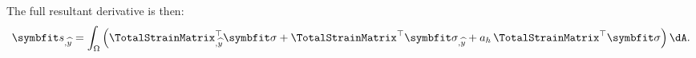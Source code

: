 
The full resultant derivative is then:
\[
\bm{s}_{,\HostParameter}
=
\int_{\Section}
\left(
{\TotalStrainMatrix}_{,\HostParameter}^{\top}\StressVector
+
\TotalStrainMatrix^{\top}\StressVector_{,\HostParameter}
+
a_h\,\TotalStrainMatrix^{\top}\StressVector
\right)\dA.
\]

